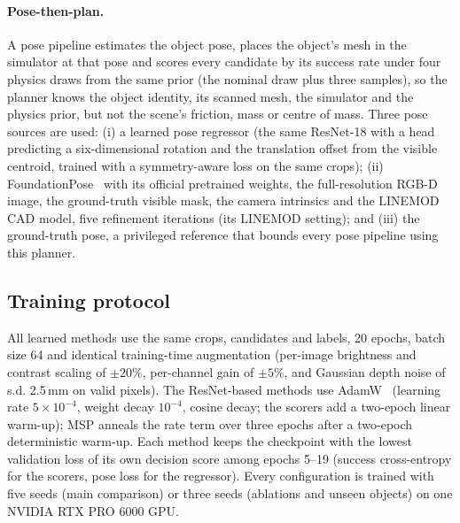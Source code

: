 \paragraph{Pose-then-plan.} A pose pipeline estimates the object pose, places the object's mesh in the simulator at that pose and scores every candidate by its success rate under four physics draws from the same prior (the nominal draw plus three samples), so the planner knows the object identity, its scanned mesh, the simulator and the physics prior, but not the scene's friction, mass or centre of mass. Three pose sources are used: (i) a learned pose regressor (the same ResNet-18 with a head predicting a six-dimensional rotation and the translation offset from the visible centroid, trained with a symmetry-aware loss on the same crops); (ii) FoundationPose~\cite{wen2024foundationpose} with its official pretrained weights, the full-resolution RGB-D image, the ground-truth visible mask, the camera intrinsics and the LINEMOD CAD model, five refinement iterations (its LINEMOD setting); and (iii) the ground-truth pose, a privileged reference that bounds every pose pipeline using this planner.

\subsection{Training protocol}
All learned methods use the same crops, candidates and labels, 20 epochs, batch size 64 and identical training-time augmentation (per-image brightness and contrast scaling of $\pm20\%$, per-channel gain of $\pm5\%$, and Gaussian depth noise of s.d. 2.5\,mm on valid pixels). The ResNet-based methods use AdamW~\cite{loshchilov2019adamw} (learning rate $5\times10^{-4}$, weight decay $10^{-4}$, cosine decay; the scorers add a two-epoch linear warm-up); MSP anneals the rate term over three epochs after a two-epoch deterministic warm-up. Each method keeps the checkpoint with the lowest validation loss of its own decision score among epochs 5--19 (success cross-entropy for the scorers, pose loss for the regressor). Every configuration is trained with five seeds (main comparison) or three seeds (ablations and unseen objects) on one NVIDIA RTX PRO 6000 GPU.

